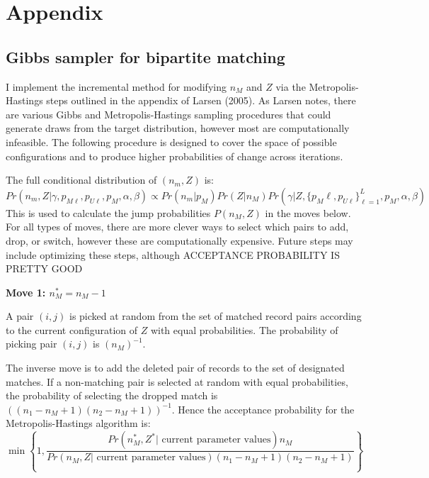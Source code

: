 \documentclass[11pt,reqno]{amsart}
\begin{document}
\newpage




\newpage
\appendix
\section{Appendix}

\subsection{Gibbs sampler for bipartite matching}
I implement the incremental method for modifying $n_M$ and $Z$ via the Metropolis-Hastings steps outlined in the appendix of Larsen (2005).  As Larsen notes, there are various Gibbs and Metropolis-Hastings sampling procedures that could generate draws from the target distribution, however most are computationally infeasible.  The following procedure is designed to cover the space of possible configurations and to produce higher probabilities of change across iterations.  

The full conditional distribution of $(n_m, Z)$ is:
\begin{equation} 
Pr\left(n_m, Z | \gamma, p_{M\ell}, p_{U\ell}, p_M, \alpha, \beta \right) \propto Pr(n_m | p_M) Pr(Z | n_M) Pr\left(\gamma | Z,  \{p_M{\ell}, p_{U\ell}\}_{\ell=1}^L, p_M, \alpha, \beta \right) \label{nmZ} \end{equation}
This is used to calculate the jump probabilities $P(n_M, Z) $ in the moves below.  For all types of moves, there are more clever ways to select which pairs to add, drop, or switch, however these are computationally expensive.  Future steps may include optimizing these steps, although ACCEPTANCE PROBABILITY IS PRETTY GOOD %

\textbf{Move 1: $n_M^* = n_M - 1 $ }

A pair $(i,j)$ is picked at random from the set of matched record pairs according to the current configuration of $Z$ with equal probabilities.  The probability of picking pair $(i,j)$ is $(n_M)^{-1}$. 

The inverse move is to add the deleted pair of records to the set of designated matches.  If a non-matching pair is selected at random with equal probabilities, the probability of selecting the dropped match is $\left((n_1 - n_M + 1)(n_2 - n_M + 1)\right)^{-1}$.  Hence the acceptance probability for the Metropolis-Hastings algorithm is:
\[ \min \left\{ 1, \frac{Pr\left(n_M^*, Z^* | \text{ current parameter values}\right)  n_M}{Pr\left(n_M, Z | \text{ current parameter values}\right) (n_1 - n_M + 1)(n_2 - n_M + 1)}\right\} \] 
\end{document}
